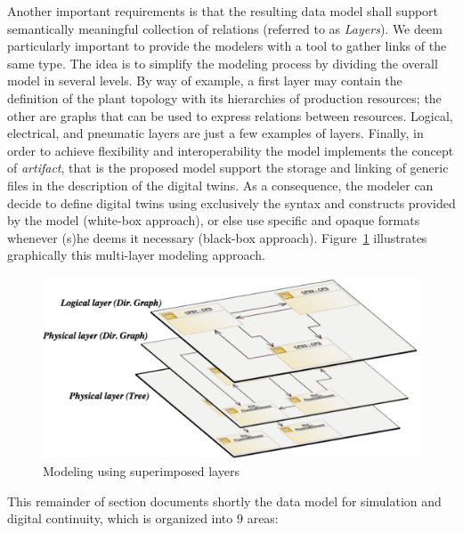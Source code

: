 Another important requirements is that the resulting data model shall support semantically meaningful collection of relations (referred to as \textit{Layers}). 
We deem particularly important to provide the modelers with a tool to gather links of the same type. 
The idea is to simplify the modeling process by dividing the overall model in several levels. 
By way of example, a first layer may contain the definition of the plant topology with its hierarchies of production resources; the other are graphs that can be used to express relations between resources. 
Logical, electrical, and pneumatic layers are just a few examples of layers.
Finally, in order to achieve flexibility and interoperability the model implements the concept of \textit{artifact}, that is the proposed model support the storage and linking of generic files in the description of the digital twins. 
As a consequence, the modeler can decide to define digital twins using exclusively the syntax and constructs provided by the model (white-box approach), or else use specific and opaque formats whenever (s)he deems it necessary (black-box approach).  
Figure~\ref{fig:layers} illustrates graphically this multi-layer modeling approach. 

\begin{figure}
	\vspace*{-0.5cm}
	\centering
	\includegraphics[width=\linewidth]{images/layers2}
	\caption{Modeling using superimposed layers}
	\label{fig:layers}
\end{figure}

This remainder of section documents shortly the data model for simulation and digital continuity, which is organized into 9 areas:

